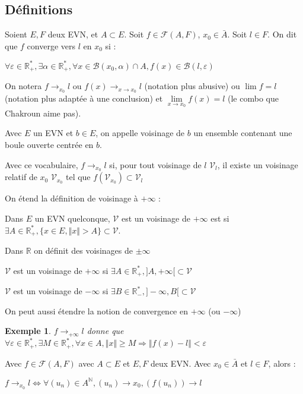\documentclass[a4paper,12pt]{book}
\newcommand{\Def}[2]{\begin{tcolorbox}[sharp corners, colback=white,colframe=blue!90!black!75, title=Définition : #1]#2\end{tcolorbox}}
\newcommand{\Prop}[2]{\begin{tcolorbox}[sharp corners, colback=white,colframe=red!90!black!75, title=Proposition : #1]#2\end{tcolorbox}}
\newtheorem{Exe}{Exemple}[section]
\def\R{\mathbb{R}}
\def\N{\mathbb{N}}
\begin{document}
\subsection{Définitions}
\Def{Limite}{Soient $E,F$ deux EVN, et $A\subset E$. Soit $f\in\mathcal{F}(A,F)$, $x_0\in\bar{A}$. Soit $l\in F$. On dit que $f$ converge vers $l$ en $x_0$ si :
\par \begin{center} $\forall\varepsilon\in\R_+^*,\exists\alpha\in\R_+^*,\forall x\in\mathcal{B}(x_0,\alpha)\cap A, f(x)\in\mathcal{B}(l,\varepsilon)$ \end{center}
\par On notera $f\to_{x_0} l$ ou $f(x)\to_{x\to x_0} l$ (notation plus abusive) ou $\lim f = l$ (notation plus adaptée à une conclusion) et $\lim\limits_{x\to x_0}f(x)=l$ (le combo que Chakroun aime pas).}
\Def{Vocabulaire du voisinage}{Avec $E$ un EVN et $b\in E$, on appelle voisinage de $b$ un ensemble contenant une boule ouverte centrée en $b$.
\par Avec ce vocabulaire, $f\to_{x_0} l$ si, pour tout voisinage de $l$ $\mathcal{V}_l$, il existe un voisinage relatif de $x_0$ $\mathcal{V}_{x_0}$ tel que $f(\mathcal{V}_{x_0})\subset\mathcal{V}_l$
\par On étend la définition de voisinage à $+\infty$ :
\par Dans $E$ un EVN quelconque, $\mathcal{V}$ est un voisinage de $+\infty$ est si $\exists A\in\R_+^*,\{x\in E, \Vert x\Vert>A\}\subset\mathcal{V}$.
\par Dans $\R$ on définit des voisinages de $\pm\infty$
\par $\mathcal{V}$ est un voisinage de $+\infty$ si $\exists A\in\R_+^*, ]A,+\infty[\subset\mathcal{V}$
\par $\mathcal{V}$ est un voisinage de $-\infty$ si $\exists B\in\R_-^*, ]-\infty, B[\subset\mathcal{V}$
\par On peut aussi étendre la notion de convergence en $+\infty$ (ou $-\infty$)}
\begin{Exe}
$f\to_{+\infty} l$ donne que $\forall\varepsilon\in\R_+^*,\exists M\in\R_+^*,\forall x\in A, \Vert x\Vert\geq M\Rightarrow \Vert f(x)-l\Vert<\varepsilon$
\end{Exe}
\Prop{Caractérisation séquentielle de la limite}{Avec $f\in\mathcal{F}(A,F)$ avec $A\subset E$ et $E,F$ deux EVN. Avec $x_0\in\bar{A}$ et $l\in F$, alors :
\par \begin{center}$f\rightarrow_{x_0}l\Leftrightarrow \forall (u_n)\in A^\N, (u_n)\to x_0, (f(u_n))\to l$ \end{center}}
\end{document}
